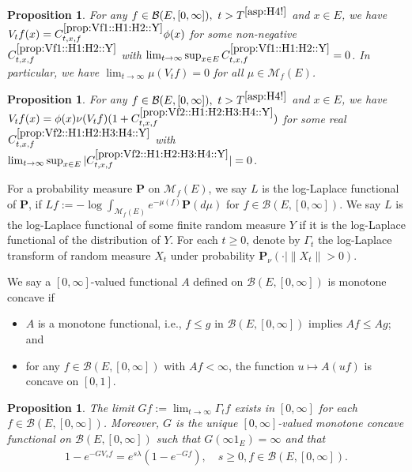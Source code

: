 \documentclass[12pt,a4paper]{amsart}
\numberwithin{equation}{section}
\theoremstyle{plain}
\newtheorem{prop}[thm]{Proposition}
\theoremstyle{definition}
\theoremstyle{remark}
\begin{document}
\begin{prop} \label{prop:Vf1::H1:H2::Y}
	For any $f\in \mathcal B(E, [0,\infty]),~t > T^{\eqref{asp:H4!}}$ and $x\in E$, we have $V_tf(x) = C^{\ref{prop:Vf1::H1:H2::Y}}_{t,x,f} \phi(x)$ for some non-negative $C_{t,x,f}^{\ref{prop:Vf1::H1:H2::Y}}$ with $\lim_{t\to \infty} \sup_{x\in E} C^{\ref{prop:Vf1::H1:H2::Y}}_{t,x,f} = 0$.
	In particular, we have $\lim_{t\to \infty} \mu(V_tf)= 0 $ for all $\mu \in \mathcal M_f(E)$.
\end{prop}

\begin{prop} \label{prop:Vf2::H1:H2:H3:H4::Y}
	For any $f\in \mathcal B(E,[0,\infty]),~t>T^{\eqref{asp:H4!}}$ and $x\in E$, we have $V_tf(x) = \phi(x) \nu (V_tf) (1+C^{\ref{prop:Vf2::H1:H2:H3:H4::Y}}_{t,x,f}) $ for some real $C^{\ref{prop:Vf2::H1:H2:H3:H4::Y}}_{t,x,f}$ with $\lim_{t\to \infty} \sup_{x\in E} |C^{\ref{prop:Vf2::H1:H2:H3:H4::Y}}_{t,x,f}| = 0$.
\end{prop}

	For a probability measure $\mathbf P$ on $\mathcal M_f(E)$, we say $L$ is the log-Laplace functional of $\mathbf P$, if $Lf := - \log \int_{\mathcal M_f(E)}  e^{-\mu(f)} \mathbf P(d\mu)$ for $f\in \mathcal B(E,[0,\infty])$.
	We say $L$ is the log-Laplace functional of some finite random measure $Y$ if it is the log-Laplace functional of the distribution of $Y$.
	For each $t\geq 0$, denote by $\Gamma_t$ the log-Laplace transform of random measure $X_t$ under probability $\mathbf P_\nu(\cdot | \|X_t\|>0)$.

	We say a $[0,\infty]$-valued functional $A$ defined on $\mathcal B(E,[0,\infty])$ is monotone concave if
\begin{itemize}
\item
	$A$ is a monotone functional, i.e., $f\leq g$ in $\mathcal B(E,[0,\infty])$ implies $Af \leq Ag$; and
\item
	for any $f\in \mathcal B(E,[0,\infty])$ with $Af< \infty$, the function $u \mapsto A(uf)$ is concave on $[0,1]$.
\end{itemize}

\begin{prop} \label{prop:G::H1:H2:H3:H4::Y}
	The limit $Gf:= \lim_{t\to \infty} \Gamma_t f$ exists in $[0,\infty]$ for each $f\in \mathcal B(E,[0,\infty])$.
	Moreover, $G$ is the unique $[0,\infty]$-valued monotone concave functional on $\mathcal B(E,[0,\infty])$ such that $G(\infty  1_E) = \infty$ and that
\begin{align} \label{eq:G.0}
	1 - e^{- GV_s f}
	= e^{s\lambda} (1 - e^{-Gf}),
	\quad s\geq 0, f\in \mathcal B(E,[0,\infty]).
\end{align}
\end{prop}
\end{document}
